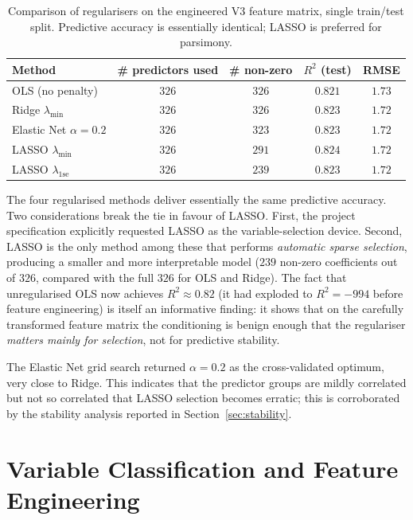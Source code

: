\documentclass[11pt,a4paper]{article}
\begin{document}
\begin{table}[h!]
  \centering
  \begin{tabular}{lcccc}
    \toprule
    Method & \# predictors used & \# non-zero & \(R^{2}\) (test) & RMSE \\
    \midrule
    OLS (no penalty)             & \(326\) & \(326\) & \(0.821\) & \(1.73\) \\
    Ridge \(\lambda_{\min}\)     & \(326\) & \(326\) & \(0.823\) & \(1.72\) \\
    Elastic Net \(\alpha=0.2\)   & \(326\) & \(323\) & \(0.823\) & \(1.72\) \\
    LASSO \(\lambda_{\min}\)     & \(326\) & \(291\) & \(0.824\) & \(1.72\) \\
    LASSO \(\lambda_{\mathrm{1se}}\) & \(326\) & \(239\) & \(0.823\) & \(1.72\) \\
    \bottomrule
  \end{tabular}
  \caption{Comparison of regularisers on the engineered V3 feature
    matrix, single train/test split. Predictive accuracy is essentially
    identical; LASSO is preferred for parsimony.}
  \label{tab:regulariser}
\end{table}

The four regularised methods deliver essentially the same predictive
accuracy. Two considerations break the tie in favour of LASSO. First,
the project specification explicitly requested LASSO as the
variable-selection device. Second, LASSO is the only method among these
that performs \emph{automatic sparse selection}, producing a smaller and
more interpretable model (\(239\) non-zero coefficients out of \(326\),
compared with the full \(326\) for OLS and Ridge). The fact that
unregularised OLS now achieves \(R^{2}\approx 0.82\) (it had exploded
to \(R^{2} = -994\) before feature engineering) is itself an
informative finding: it shows that on the carefully transformed feature
matrix the conditioning is benign enough that the regulariser
\emph{matters mainly for selection}, not for predictive stability.

The Elastic Net grid search returned \(\alpha = 0.2\) as the
cross-validated optimum, very close to Ridge. This indicates that the
predictor groups are mildly correlated but not so correlated that LASSO
selection becomes erratic; this is corroborated by the stability
analysis reported in Section~\ref{sec:stability}.

\section{Variable Classification and Feature Engineering}
\label{sec:fe}
\end{document}
